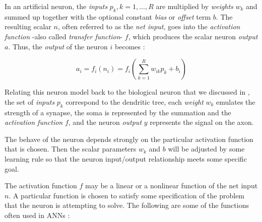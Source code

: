 In an artificial neuron, the \emph{inputs} $p_{k}, k=1,...,R$ are multiplied by \emph{weights} $w_{k}$ and summed up together with the optional constant \emph{bias} or \emph{offset} term $b$. The resulting scalar $n$, often referred to as the \emph{net input}, goes into the \emph{activation function} -also called \emph{transfer function}- $f$, which produces the scalar neuron \emph{output} $a$.
Thus, the \emph{output} of the neuron $i$ becomes \cite{Demuth:2014:NND:2721661}:

\begin{equation}
a_{i}=f_{i}(n_{i})=f_{i}(\sum_{k=1}^R w_{ik}p_{k}+b_{i})
\label{eq:expandedgeneralneuroneq}
\end{equation}

Relating this neuron model back to the biological neuron that we discussed in , the set of \emph{inputs} $p_{k}$ correspond to the dendritic tree,
each \emph{weight} $w_{k}$ emulates the strength of a synapse, the soma is represented by the summation and the \emph{activation function} $f$,
and the neuron \emph{output} $y$ represents the signal on the axon.

The behave of the neuron depends strongly on the particular activation function that is chosen. Then the scalar parameters $w_{k}$ and $b$ will be adjusted by some learning rule so that the neuron input/output relationship meets some specific goal.

The activation function $f$ may be a linear or a nonlinear function of the net input $n$. 
A particular function is chosen to satisfy some specification of the problem that the neuron is attempting to solve. The following are some of the functions often used in ANNs \cite{Demuth:2014:NND:2721661}:

